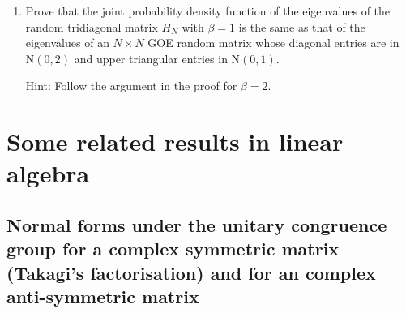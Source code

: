 \documentclass[11pt, a4paper]{article}
\numberwithin{equation}{section}
\newcommand{\Normal}{\mathrm{N}}
\theoremstyle{definition}
\theoremstyle{remark}
\begin{document}
\begin{enumerate}
\item \label{enu:ex_4_1}
  Prove that the joint probability density function of the eigenvalues of the random tridiagonal matrix $H_N$ with $\beta = 1$ is the same as that of the eigenvalues of an $N \times N$ GOE random matrix whose diagonal entries are in $\Normal(0, 2)$ and upper triangular entries in $\Normal(0, 1)$.

  Hint: Follow the argument in the proof for $\beta = 2$.
\end{enumerate}

\appendix

\section{Some related results in linear algebra}

\subsection{Normal forms under the unitary congruence group for a complex symmetric matrix (Takagi's factorisation) and for an complex anti-symmetric matrix} \label{subsec:Takagi_and_antisymm}
\end{document}
